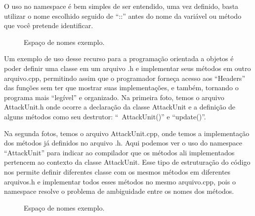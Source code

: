 \documentclass[rel_mlp]{iiufrgs}
\newcommand{\fonte}[1]{\\Fonte: {#1}}
\begin{document}
   	O uso no namespace é bem simples de ser entendido, uma vez definido, basta utilizar o nome escolhido seguido de “::” antes do nome da variável ou método que você pretende identificar.

   \begin{figure}[htb]
       \centering
       \label{fig:figura4}
       \caption{Espaço de nomes exemplo.}
   \end{figure}

   Um exemplo de uso desse recurso para a programação orientada a objetos é poder definir uma classe em um arquivo .h e implementar seus métodos em outro arquivo.cpp, permitindo assim que o programador forneça acesso aos “Headers” das funções sem ter que mostrar suas implementações, e também, tornando o programa mais “legível” e organizado.
   	Na primeira foto, temos o arquivo AttackUnit.h onde ocorre a declaração da classe AttackUnit e a definição de alguns métodos como seu destrutor: “~AttackUnit()” e “update()”.

   	Na segunda fotos, temos o arquivo AttackUnit.cpp, onde temos a implementação dos métodos já definidos no arquivo .h. Aqui podemos ver o uso do namespace “AttackUnit” para indicar ao compilador que os métodos ali implementados pertencem ao contexto da classe AttackUnit.
   	Esse tipo de estruturação do código nos permite definir diferentes classe com os mesmos métodos em diferentes arquivos.h  e implementar todos esses métodos no mesmo arquivo.cpp, pois o namespace resolve o problema de ambiguidade entre os nomes dos métodos.


   \begin{figure}[htb]
       \centering
       \label{fig:figura5}
       \caption{Espaço de nomes exemplo.}
   \end{figure}
\end{document}
